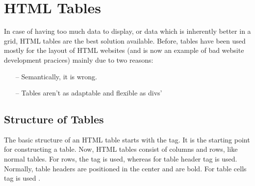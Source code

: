 %
%
%
%
%



\chapter{HTML Tables}

\label{HTML5 Tables}

In case of having too much data to display, or data which is
inherently better in a grid, HTML tables are the best solution
available. Before, tables have been used mostly for the layout of HTML
websites (and is now an example of bad website development pracices)
mainly due to two reasons:
\begin{itemize}
    \item[--] Semantically, it is wrong.
    \item[--] Tables aren't as adaptable and flexible as divs'
\end{itemize}

\section{Structure of Tables}

The basic structure of an HTML table starts with the 
tag. It is the starting point for constructing a table. Now, HTML
tables consist of columns and rows, like normal tables. For rows, the
tag   is used, whereas for table header  tag
is used. Normally, table headers are positioned in the center and are
bold. For table cells  tag is used \parencite{AdamWood}.

